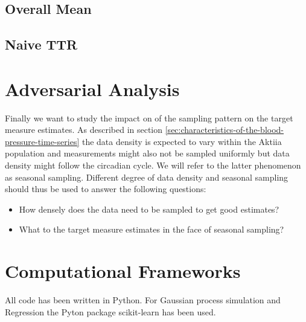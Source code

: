 %



\subsection{Overall Mean}



\subsection{Naive TTR}






\section{Adversarial Analysis}\label{sec:adversarial-analysis}

Finally we want to study the impact on of the sampling pattern on the target measure estimates.
As described in section \ref{sec:characteristics-of-the-blood-pressure-time-series}
the data density is expected to vary within the Aktiia population and
measurements might
also not be sampled uniformly but data density might follow the circadian cycle.
We will refer to the latter phenomenon as seasonal sampling.
Different degree of data density and seasonal sampling should thus be used to
answer the following questions:
\begin{itemize}
    \item How densely does the data need to be sampled to get good estimates?
    \item What to the target measure estimates in the face of seasonal sampling?
\end{itemize}



\section{Computational Frameworks}

All code has been written in Python.
For Gaussian process simulation and Regression the Pyton package scikit-learn
has been used.

















